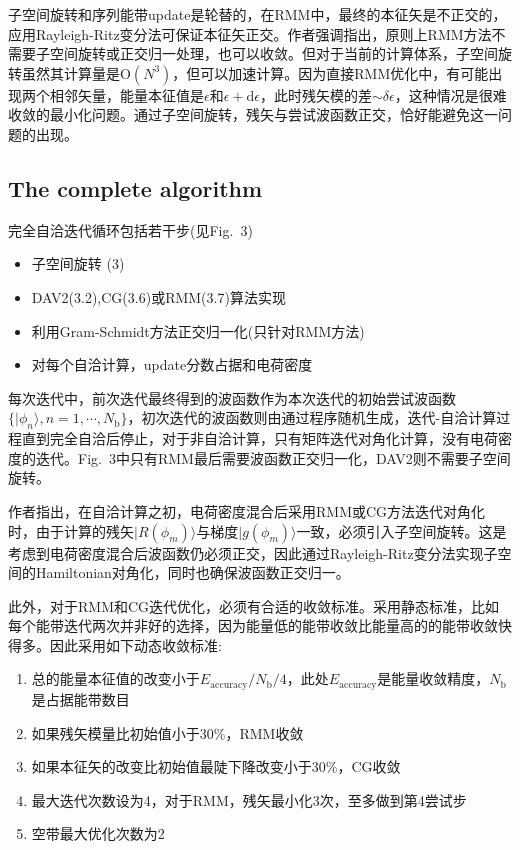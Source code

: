 \documentclass[14pt]{article}      %
\begin{document}
子空间旋转和序列能带\textrm{update}是轮替的，在\textrm{RMM}中，最终的本征矢是不正交的，应用\textrm{Rayleigh-Ritz}变分法可保证本征矢正交。作者强调指出，原则上\textrm{RMM}方法不需要子空间旋转或正交归一处理，也可以收敛。但对于当前的计算体系，子空间旋转虽然其计算量是$\mathrm{O}(N^3)$，但可以加速计算。因为直接\textrm{RMM}优化中，有可能出现两个相邻矢量，能量本征值是$\epsilon$和$\epsilon+\mathrm{d}\epsilon$，此时残矢模的差$\sim\delta\epsilon$，这种情况是很难收敛的最小化问题。通过子空间旋转，残矢与尝试波函数正交，恰好能避免这一问题的出现。

\subsection{The complete algorithm}
完全自洽迭代循环包括若干步(见\textrm{Fig.~3})
\begin{itemize}
	\item 子空间旋转 (3)
	\item \textrm{DAV2(3.2)},\textrm{CG(3.6)}或\textrm{RMM(3.7)}算法实现
	\item 利用\textrm{Gram-Schmidt}方法正交归一化(只针对\textrm{RMM}方法)
	\item 对每个自洽计算，\textrm{update}分数占据和电荷密度
\end{itemize}
每次迭代中，前次迭代最终得到的波函数作为本次迭代的初始尝试波函数$\{|\phi_n\rangle,n=1,\cdots,N_{\mathrm{b}}\}$，初次迭代的波函数则由通过程序随机生成，迭代-自洽计算过程直到完全自洽后停止，对于非自洽计算，只有矩阵迭代对角化计算，没有电荷密度的迭代。\textrm{Fig.~3}中只有\textrm{RMM}最后需要波函数正交归一化，\textrm{DAV2}则不需要子空间旋转。

作者指出，在自洽计算之初，电荷密度混合后采用\textrm{RMM}或\textrm{CG}方法迭代对角化时，由于计算的残矢$|R(\phi_m)\rangle$与梯度$|g(\phi_m)\rangle$一致，必须引入子空间旋转。这是考虑到电荷密度混合后波函数仍必须正交，因此通过\textrm{Rayleigh-Ritz}变分法实现子空间的\textrm{Hamiltonian}对角化，同时也确保波函数正交归一。

此外，对于\textrm{RMM}和\textrm{CG}迭代优化，必须有合适的收敛标准。采用静态标准，比如每个能带迭代两次并非好的选择，因为能量低的能带收敛比能量高的的能带收敛快得多。因此采用如下动态收敛标准:
\begin{enumerate}
	\item 总的能量本征值的改变小于$E_{\mathrm{accuracy}}/N_{\mathrm{b}}/4$，此处$E_{\mathrm{accuracy}}$是能量收敛精度，$N_{\mathrm{b}}$是占据能带数目
	\item 如果残矢模量比初始值小于\textrm{30\%}，\textrm{RMM}收敛
	\item 如果本征矢的改变比初始值最陡下降改变小于\textrm{30\%}，\textrm{CG}收敛
	\item 最大迭代次数设为\textrm{4}，对于\textrm{RMM}，残矢最小化\textrm{3}次，至多做到第\textrm{4}尝试步
	\item 空带最大优化次数为\textrm{2}
\end{enumerate}
\end{document}

